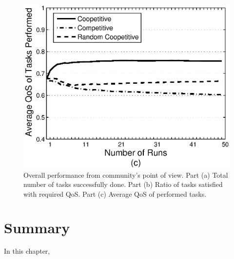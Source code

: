 \begin{figure}[h]
\includegraphics[scale=0.35]{Figures/graphavgqostask.eps}
\caption{Overall performance from community's point of view. Part
(a) Total number of tasks successfully done. Part (b) Ratio of
tasks satisfied with required QoS. Part (c) Average QoS of
performed tasks.} \label{graph_task}
\end{figure}

\section{Summary}\label{sec:conclusion-cha3}


In this chapter,


